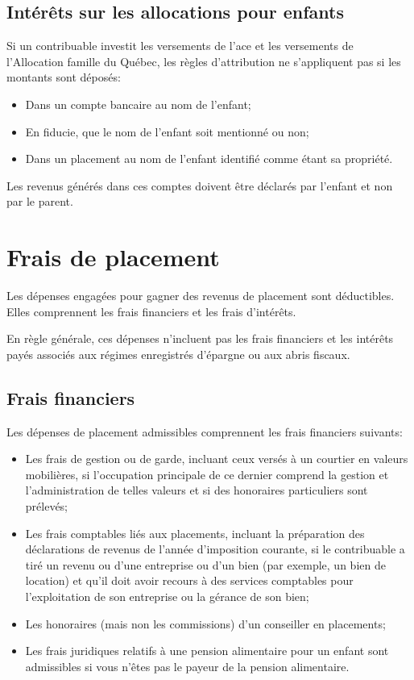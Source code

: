 \subsection{Intérêts sur les allocations pour enfants}
Si un contribuable investit les versements de l'\acrfull{ace} et les versements de l'Allocation famille du Québec, les règles d'attribution ne s'appliquent pas si les montants sont déposés:
\begin{itemize}
	\item Dans un compte bancaire au nom de l'enfant;
	\item En fiducie, que le nom de l'enfant soit mentionné ou non;
	\item Dans un placement au nom de l'enfant identifié comme étant sa propriété.
\end{itemize}

Les revenus générés dans ces comptes doivent être déclarés par l'enfant et non par le parent.



\section{Frais de placement}
\begin{intro}
	Les dépenses engagées pour gagner des revenus de placement sont déductibles. Elles comprennent les frais financiers et les frais d'intérêts.
	
	En règle générale, ces dépenses n'incluent pas les frais financiers et les intérêts payés associés aux régimes enregistrés d'épargne ou aux abris fiscaux.
\end{intro}


\subsection{Frais financiers}
Les dépenses de placement admissibles comprennent les frais financiers suivants:
\begin{itemize}
	\item Les frais de gestion ou de garde, incluant ceux versés à un courtier en valeurs mobilières, si l'occupation principale de ce dernier comprend la gestion et l'administration de telles valeurs et si des honoraires particuliers sont prélevés;
	\item Les frais comptables liés aux placements, incluant la préparation des déclarations de revenus de l'année d'imposition courante, si le contribuable a tiré un revenu ou d'une entreprise ou d'un bien (par exemple, un bien de location) et qu'il doit avoir recours à des services comptables pour l'exploitation de son entreprise ou la gérance de son bien;
	\item Les honoraires (mais non les commissions) d'un conseiller en placements; 
	\item Les frais juridiques relatifs à une pension alimentaire pour un enfant sont admissibles si vous n'êtes pas le payeur de la pension alimentaire.
\end{itemize}

